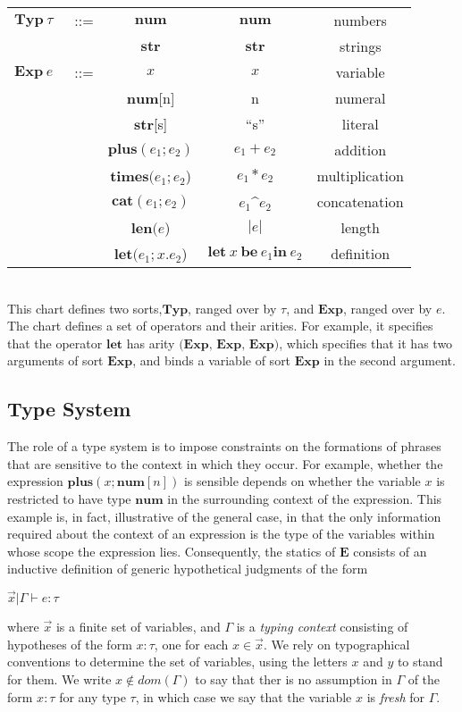 \begin{tabular}{ccccc}
    $\mathbf{Typ} \ \tau$&~::= & $\mathbf{num}$ & $\mathbf{num}$ & numbers\\ 
    &  & $\mathbf{str}$ & $\mathbf{str}$ & strings\\ 
    $\mathbf{Exp} \ e$ &~::= & $x$ & $x$ & variable\\ 
    &  & $\mathbf{num}$[n] & n & numeral \\ 
    &  & $\mathbf{str}$[s] & ``s'' & literal\\ 
    &  & $\mathbf{plus}(e_1;e_2)$ & $e_1+e_2$ & addition\\ 
    &  & $\mathbf{times}(e_1;e_2$) & $e_1*e_2$ & multiplication\\ 
    &  & $\mathbf{cat}(e_1;e_2)$ & $e_1$\textasciicircum$ e_2$ & concatenation\\ 
    &  & $\mathbf{len}(e$) & $|e|$ & length\\ 
    &  & $\mathbf{let}(e_1;x.e_2$) & $\mathbf{let} \ x \ \mathbf{be}\  e_1 \textbf{in} \ e_2$ & definition\\ 
\end{tabular} \\


This chart defines two sorts,$\mathbf{Typ}$, ranged over by $\tau$, and
$\mathbf{Exp}$, ranged over by $e$. The chart defines a set of operators and
their arities. For example, it specifies that the operator $\mathbf{let}$ has
arity $\textbf{(Exp, Exp, Exp)}$, which specifies that it has two arguments of
sort $\textbf{Exp}$, and binds a variable of sort $\mathbf{Exp}$ in the second
argument.


\subsection{Type System} The role of a type system is to impose constraints on
the formations of phrases that are sensitive to the context in which they occur.
For example, whether the expression $\mathbf{plus}(x;\mathbf{num}[n])$ is
sensible depends on whether the variable $x$ is restricted to have type
$\mathbf{num}$ in the surrounding context of the expression. This example is, in
fact, illustrative of the general case, in that the only information required
about the context of an expression is the type of the variables within whose
scope the expression lies.  Consequently, the statics of $\mathbf{E}$ consists
of an inductive definition of generic hypothetical judgments of the form
\begin{center}
    $\overrightarrow{x}|\Gamma \vdash e:\tau$
\end{center}
where $\overrightarrow{x}$ is a finite set of variables, and $\Gamma$ is a
\textit{typing context} consisting of hypotheses of the form $x:\tau$, one for
each $x\in\overrightarrow{x}$. We rely on typographical conventions to determine
the set of variables, using the letters $x$ and $y$ to stand for them. We write
$x \notin \mathit{dom}(\Gamma)$ to say that ther is no assumption in $\Gamma$ of
the form $x:\tau$ for any type $\tau$, in which case we say that the variable
$x$ is \textit{fresh} for $\Gamma$.


